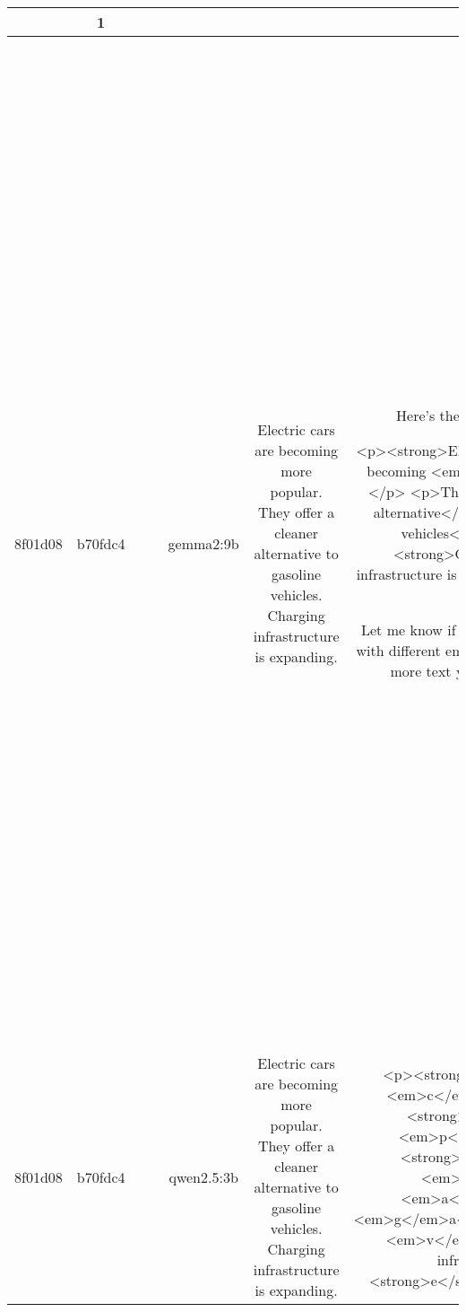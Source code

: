 \begin{table}[h!]
\begin{tabular}{|c|c|c|c|c|c|c|c|c|c|}
{{No part of the evaluation involves needing to know the input, so I do not need to check the correctness of the tagged content against any input. Based purely on compliance with the requirements in the description, this output satisfies all the rules that need checking. 

No violation.
OK & 1\\
\hline
8f01d08 & b70fdc4 &  &  & gemma2:9b & Electric cars are becoming more popular. They offer a cleaner alternative to gasoline vehicles. Charging infrastructure is expanding. & Here's the formatted HTML:

<p><strong>Electric</strong> cars are becoming <em>more popular</em>.</p>
<p>They offer a <em>cleaner alternative</em> to <em>gasoline vehicles</em>.</p>
<p><strong>Charging</strong> infrastructure is <em>expanding</em>.</p> 


Let me know if you'd like to experiment with different emphasis levels or have any more text you want formatted! & ok & The evaluation process is focused on verifying the chatbot's output against the description provided. Here's the evaluation:

1. The output contains three sentences, each wrapped in a <p> tag, satisfying the requirement for having at least three <p> tags.

2. Within each <p> tag, the output includes at least one <strong> tag. The first <p> tag contains <strong>Electric</strong>, and the third <p> tag contains <strong>Charging</strong>. This aligns with the requirement to have a <strong> tag inside each <p> tag.

3. The output includes multiple <em> tags within the <p> tags, highlighting key words and phrases. Specifically, the first <p> tag has <em>more popular</em>, the second <p> tag has <em>cleaner alternative</em> and <em>gasoline vehicles</em>, and the third <p> tag has <em>expanding</em>.

Since all the rules that can be evaluated without the input are followed, the output complies with the guidelines provided. There are no violations against the description provided based on the given output.

No violation.
OK & 1\\
\hline
8f01d08 & b70fdc4 &  &  & qwen2.5:3b & Electric cars are becoming more popular. They offer a cleaner alternative to gasoline vehicles. Charging infrastructure is expanding. & <p><strong>E</strong>lectric <em>c</em>ars are becoming <strong>m</strong>ore <em>p</em>opular. They <strong>O</strong>ffer a <em>c</em>leaner <em>a</em>lternative to <em>g</em>a<strong>l</strong>esine <em>v</em>ehicles. Charging infrastructure is <strong>e</strong>xpanding.</p> & err & The output does not comply with the chatbot description for several reasons:

}}
\end{tabular}
\end{table}
